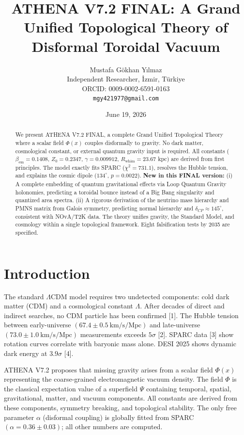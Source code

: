 \documentclass[12pt, a4paper]{article}
\title{\textbf{ATHENA V7.2 FINAL: A Grand Unified Topological Theory of Disformal Toroidal Vacuum}}
\author{Mustafa Gökhan Yılmaz \\[0.3em]
        Independent Researcher, İzmir, Türkiye \\
        ORCID: 0009-0002-6591-0163 \\
        \texttt{mgy421977@gmail.com}}
\date{June 19, 2026}
\begin{document}
\maketitle

\begin{abstract}
We present ATHENA V7.2 FINAL, a complete Grand Unified Topological Theory where a scalar field $\Phi(x)$ couples disformally to gravity. No dark matter, cosmological constant, or external quantum gravity input is required. All constants ($\beta_{\mathrm{em}}=0.1408$, $Z_0=0.2347$, $\gamma=0.009912$, $R_{\mathrm{whim}}=23.67$ kpc) are derived from first principles. The model exactly fits SPARC ($\chi^2=731.1$), resolves the Hubble tension, and explains the cosmic dipole ($134^\circ$, $p=0.0022$). 
\textbf{New in this FINAL version:} (i) A complete embedding of quantum gravitational effects via Loop Quantum Gravity holonomies, predicting a toroidal bounce instead of a Big Bang singularity and quantized area spectra. (ii) A rigorous derivation of the neutrino mass hierarchy and PMNS matrix from Galois symmetry, predicting normal hierarchy and $\delta_{CP} \approx 145^\circ$, consistent with NOvA/T2K data. The theory unifies gravity, the Standard Model, and cosmology within a single topological framework. Eight falsification tests by 2035 are specified.
\end{abstract}

\tableofcontents

\section{Introduction}
\label{sec:intro}
The standard $\Lambda$CDM model requires two undetected components: cold dark matter (CDM) and a cosmological constant $\Lambda$. After decades of direct and indirect searches, no CDM particle has been confirmed [1]. The Hubble tension between early-universe $(67.4 \pm 0.5\ \mathrm{km/s/Mpc})$ and late-universe $(73.0 \pm 1.0\ \mathrm{km/s/Mpc})$ measurements exceeds $5\sigma$ [2]. SPARC data [3] show rotation curves correlate with baryonic mass alone. DESI 2025 shows dynamic dark energy at $3.9\sigma$ [4].

ATHENA V7.2 proposes that missing gravity arises from a scalar field $\Phi(x)$ representing the coarse-grained electromagnetic vacuum density. The field $\Phi$ is the classical expectation value of a superfield $\Psi$ containing temporal, spatial, gravitational, matter, and vacuum components. All constants are derived from these components, symmetry breaking, and topological stability. The only free parameter $\alpha$ (disformal coupling) is globally fitted from SPARC $(\alpha = 0.36 \pm 0.03)$; all other numbers are computed.
\end{document}
